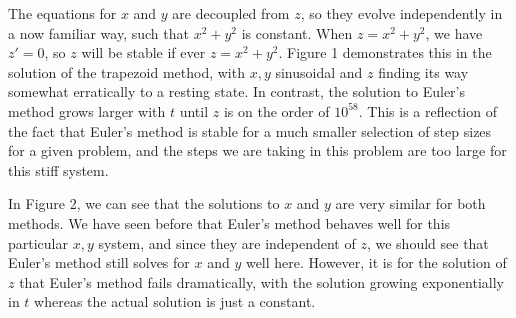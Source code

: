 \documentclass[12pt]{article}
\begin{document}
The equations for $x$ and $y$ are decoupled from $z$, so they evolve independently in a now familiar way, such that $x^2 + y^2$ is constant. When $z = x^2 + y^2$, we have $z' = 0$, so $z$ will be stable if ever $z = x^2 + y^2$. Figure 1 demonstrates this in the solution of the trapezoid method, with $x,y$ sinusoidal and $z$ finding its way somewhat erratically to a resting state. In contrast, the solution to Euler's method grows larger with $t$ until $z$ is on the order of $10^{58}$. This is a reflection of the fact that Euler's method is stable for a much smaller selection of step sizes for a given problem, and the steps we are taking in this problem are too large for this stiff system.

In Figure 2, we can see that the solutions to $x$ and $y$ are very similar for both methods. We have seen before that Euler's method behaves well for this particular $x,y$ system, and since they are independent of $z$, we should see that Euler's method still solves for $x$ and $y$ well here. However, it is for the solution of $z$ that Euler's method fails dramatically, with the solution growing exponentially in $t$ whereas the actual solution is just a constant.
\end{document}
